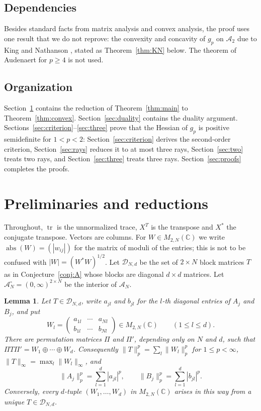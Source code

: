 \documentclass[11pt]{amsart}
\newtheorem{lemma}[theorem]{Lemma}
\theoremstyle{definition}
\theoremstyle{remark}
\numberwithin{equation}{section}
\newcommand{\C}{\mathbb{C}}
\newcommand{\tr}{\operatorname{tr}}
\newcommand{\abs}{\operatorname{abs}}
\newcommand{\cA}{\mathcal{A}}
\newcommand{\cD}{\mathcal{D}}
\begin{document}
\subsection*{Dependencies}
Besides standard facts from matrix analysis and convex analysis, the proof uses one result that we do not reprove: the convexity and concavity of $g_p$ on $\cA_2$ due to King and Nathanson \cite[Lemma~3]{KN04}, stated as Theorem~\ref{thm:KN} below. The theorem of Audenaert for $p\ge4$ is not used.

\subsection*{Organization}
Section~\ref{sec:prelim} contains the reduction of Theorem~\ref{thm:main} to Theorem~\ref{thm:convex}. Section~\ref{sec:duality} contains the duality argument. Sections~\ref{sec:criterion}--\ref{sec:three} prove that the Hessian of $g_p$ is positive semidefinite for $1<p<2$: Section~\ref{sec:criterion} derives the second-order criterion, Section~\ref{sec:rays} reduces it to at most three rays, Section~\ref{sec:two} treats two rays, and Section~\ref{sec:three} treats three rays. Section~\ref{sec:proofs} completes the proofs.

\section{Preliminaries and reductions}\label{sec:prelim}

Throughout, $\tr$ is the unnormalized trace, $X^T$ is the transpose and $X^*$ the conjugate transpose. Vectors are columns. For $W\in M_{2,N}(\C)$ we write $\abs(W)=(|w_{ij}|)$ for the matrix of moduli of the entries; this is not to be confused with $|W|=(W^*W)^{1/2}$. Let $\cD_{N,d}$ be the set of $2\times N$ block matrices $T$ as in Conjecture~\ref{conj:A} whose blocks are diagonal $d\times d$ matrices. Let $\cA_N^\circ=(0,\infty)^{2\times N}$ be the interior of $\cA_N$.

\begin{lemma}\label{lem:directsum}
Let $T\in\cD_{N,d}$, write $a_{jl}$ and $b_{jl}$ for the $l$-th diagonal entries of $A_j$ and $B_j$, and put
\[
W_l=\begin{pmatrix}a_{1l}&\cdots&a_{Nl}\\ b_{1l}&\cdots&b_{Nl}\end{pmatrix}\in M_{2,N}(\C)\qquad(1\le l\le d).
\]
There are permutation matrices $\Pi$ and $\Pi'$, depending only on $N$ and $d$, such that $\Pi T\Pi'=W_1\oplus\cdots\oplus W_d$. Consequently $\|T\|_p^p=\sum_l\|W_l\|_p^p$ for $1\le p<\infty$, $\|T\|_\infty=\max_l\|W_l\|_\infty$, and
\begin{equation}\label{eq:Cpentries}
\|A_j\|_p^p=\sum_{l=1}^d|a_{jl}|^p,\qquad \|B_j\|_p^p=\sum_{l=1}^d|b_{jl}|^p .
\end{equation}
Conversely, every $d$-tuple $(W_1,\dots,W_d)$ in $M_{2,N}(\C)$ arises in this way from a unique $T\in\cD_{N,d}$.
\end{lemma}
\end{document}

